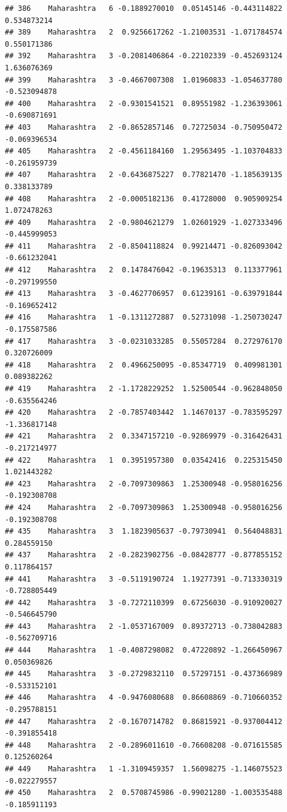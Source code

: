 \documentclass[
]{article}
\begin{document}
\begin{verbatim}
## 386    Maharashtra   6 -0.1889270010  0.05145146 -0.443114822  0.534873214
## 389    Maharashtra   2  0.9256617262 -1.21003531 -1.071784574  0.550171386
## 392    Maharashtra   3 -0.2081406864 -0.22102339 -0.452693124  1.636076369
## 399    Maharashtra   3 -0.4667007308  1.01960833 -1.054637780 -0.523094878
## 400    Maharashtra   2 -0.9301541521  0.89551982 -1.236393061 -0.690871691
## 403    Maharashtra   2 -0.8652857146  0.72725034 -0.750950472 -0.069396534
## 405    Maharashtra   2 -0.4561184160  1.29563495 -1.103704833 -0.261959739
## 407    Maharashtra   2 -0.6436875227  0.77821470 -1.185639135  0.338133789
## 408    Maharashtra   2 -0.0005182136  0.41728000  0.905909254  1.072478263
## 409    Maharashtra   2 -0.9804621279  1.02601929 -1.027333496 -0.445999053
## 411    Maharashtra   2 -0.8504118824  0.99214471 -0.826093042 -0.661232041
## 412    Maharashtra   2  0.1478476042 -0.19635313  0.113377961 -0.297199550
## 413    Maharashtra   3 -0.4627706957  0.61239161 -0.639791844 -0.169652412
## 416    Maharashtra   1 -0.1311272887  0.52731098 -1.250730247 -0.175587586
## 417    Maharashtra   3 -0.0231033285  0.55057284  0.272976170  0.320726009
## 418    Maharashtra   2  0.4966250095 -0.85347719  0.409981301  0.089382262
## 419    Maharashtra   2 -1.1728229252  1.52500544 -0.962848050 -0.635564246
## 420    Maharashtra   2 -0.7857403442  1.14670137 -0.783595297 -1.336817148
## 421    Maharashtra   2  0.3347157210 -0.92869979 -0.316426431 -0.217214977
## 422    Maharashtra   1  0.3951957380  0.03542416  0.225315450  1.021443282
## 423    Maharashtra   2 -0.7097309863  1.25300948 -0.958016256 -0.192308708
## 424    Maharashtra   2 -0.7097309863  1.25300948 -0.958016256 -0.192308708
## 435    Maharashtra   3  1.1823905637 -0.79730941  0.564048831  0.284559150
## 437    Maharashtra   2 -0.2823902756 -0.08428777 -0.877855152  0.117864157
## 441    Maharashtra   3 -0.5119190724  1.19277391 -0.713330319 -0.728805449
## 442    Maharashtra   3 -0.7272110399  0.67256030 -0.910920027 -0.546645790
## 443    Maharashtra   2 -1.0537167009  0.89372713 -0.738042883 -0.562709716
## 444    Maharashtra   1 -0.4087298082  0.47220892 -1.266450967  0.050369826
## 445    Maharashtra   3 -0.2729832110  0.57297151 -0.437366989 -0.533152101
## 446    Maharashtra   4 -0.9476080688  0.86608869 -0.710660352 -0.295788151
## 447    Maharashtra   2 -0.1670714782  0.86815921 -0.937004412 -0.391855418
## 448    Maharashtra   2 -0.2896011610 -0.76608208 -0.071615585  0.125260264
## 449    Maharashtra   1 -1.3109459357  1.56098275 -1.146075523 -0.022279557
## 450    Maharashtra   2  0.5708745986 -0.99021280 -1.003535488 -0.185911193

\end{verbatim}
\end{document}
